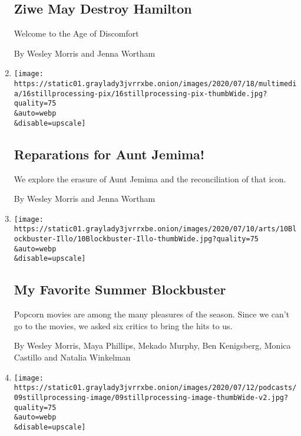 \begin{enumerate}
  \hypertarget{ziwe-may-destroy-hamilton}{%
  \subsection{Ziwe May Destroy
  Hamilton}\label{ziwe-may-destroy-hamilton}}

  Welcome to the Age of Discomfort

  By Wesley Morris and Jenna Wortham
\item
  \href{/2020/07/16/podcasts/reparations-for-aunt-jemima.html}{}

  \texttt{[image: https://static01.graylady3jvrrxbe.onion/images/2020/07/18/multimedia/16stillprocessing-pix/16stillprocessing-pix-thumbWide.jpg?quality=75\\\&auto=webp\\\&disable=upscale]}

  \hypertarget{reparations-for-aunt-jemima}{%
  \subsection{Reparations for Aunt
  Jemima!}\label{reparations-for-aunt-jemima}}

  We explore the erasure of Aunt Jemima and the reconciliation of that
  icon.

  By Wesley Morris and Jenna Wortham
\item
  \href{/2020/07/09/movies/summer-movies-blockbusters.html}{}

  \texttt{[image: https://static01.graylady3jvrrxbe.onion/images/2020/07/10/arts/10Blockbuster-Illo/10Blockbuster-Illo-thumbWide.jpg?quality=75\\\&auto=webp\\\&disable=upscale]}

  \hypertarget{my-favorite-summer-blockbuster}{%
  \subsection{My Favorite Summer
  Blockbuster}\label{my-favorite-summer-blockbuster}}

  Popcorn movies are among the many pleasures of the season. Since we
  can't go to the movies, we asked six critics to bring the hits to us.

  By Wesley Morris, Maya Phillips, Mekado Murphy, Ben Kenigsberg, Monica
  Castillo and Natalia Winkelman
\item
  \href{/2020/07/09/podcasts/still-processing-black-lives-matter.html}{}

  \texttt{[image: https://static01.graylady3jvrrxbe.onion/images/2020/07/12/podcasts/09stillprocessing-image/09stillprocessing-image-thumbWide-v2.jpg?quality=75\\\&auto=webp\\\&disable=upscale]}


\end{enumerate}
